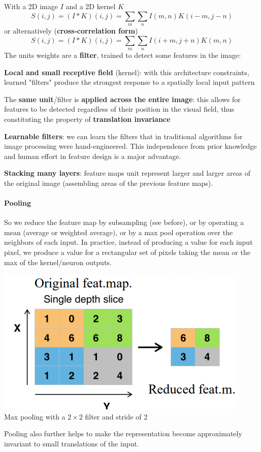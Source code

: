 \documentclass[10pt]{report}
\begin{document}
With a 2D image $I$ and a 2D kernel $K$ $$S(i,j) = (I*K)(i,j)=\sum_m\sum_n I(m,n)K(i-m,j-n)$$ or alternatively (\textbf{cross-correlation form}) $$S(i,j) = (I*K)(i,j)=\sum_m\sum_n I(i+m,j+n)K(m,n)$$
The units weights are a \textbf{filter}, trained to detect some features in the image:
\begin{list}{}{}
	\item \textbf{Local and small receptive field} (kernel): with this architecture constraints, learned "filters" produce the strongest response to a spatially local input pattern
	\item The \textbf{same unit}/filter is \textbf{applied across the entire image}: this allows for features to be detected regardless of their position in the visual field, thus constituting the property of \textbf{translation invariance}
	\item \textbf{Learnable filters}: we can learn the filters that in traditional algorithms for image processing were hand-engineered. This independence from prior knowledge and human effort in feature design is a major advantage.
	\item \textbf{Stacking many layers}: feature maps unit represent larger and larger areas of the original image (assembling areas of the previous feature maps).
\end{list}
\paragraph{Pooling} So we reduce the feature map by subsampling (see before), or by operating a mean (average or weighted average), or by a max pool operation over the neighbors of each input. In practice, instead of producing a value for each input pixel, we produce a value for a rectangular set of pixels taking the mean or the max of the kernel/neuron outputs.
\begin{center}
	\includegraphics[scale=0.5]{29.png}\\
	Max pooling with a $2\times2$ filter and stride of $2$
\end{center}
Pooling also further helps to make the representation become approximately invariant to small translations of the input.
\end{document}
